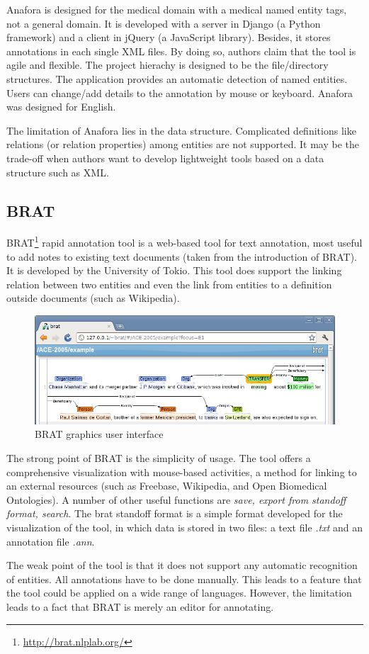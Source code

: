 Anafora is designed for the medical domain with a medical named entity tags, not a general domain.
It is developed with a server in Django (a Python framework) and a client in jQuery (a JavaScript library).
Besides, it stores annotations in each single XML files.
By doing so, authors claim that the tool is agile and flexible.
The project hierachy is designed to be the file/directory structures.
The application provides an automatic detection of named entities.
Users can change/add details to the annotation by mouse or keyboard.
Anafora was designed for English.

The limitation of Anafora lies in the data structure.
Complicated definitions like relations (or relation properties) among entities
are not supported. It may be the trade-off when authors want to develop lightweight
tools based on a data structure such as XML.

\subsection{BRAT}

BRAT\footnote{\url{http://brat.nlplab.org/}} rapid annotation tool is a web-based tool for text annotation,
most useful to add notes to existing text documents (taken from the introduction of BRAT).
It is developed by the University of Tokio.
This tool does support the linking relation between two entities and even the link from entities to a definition outside documents (such as Wikipedia).

\begin{figure}[!htb]
	\centering
	\includegraphics[width=\textwidth]{Images/brat}
	\caption{BRAT graphics user interface}
	\label{fig:Second}
\end{figure}

The strong point of BRAT is the simplicity of usage.
The tool offers a comprehensive visualization with mouse-based activities,
a method for linking to an external resources (such as Freebase, Wikipedia, and Open Biomedical Ontologies).
A number of other useful functions are \textit{save, export from standoff format, search}.
The brat standoff format is a simple format developed for the visualization of the tool,
in which data is stored in two files: a text file \textit{.txt} and an annotation file \textit{.ann}.

The weak point of the tool is that it does not support any automatic recognition of entities.
All annotations have to be done manually.
This leads to a feature that the tool could be applied on a wide range of languages.
However, the limitation leads to a fact that BRAT is merely an editor for annotating.
